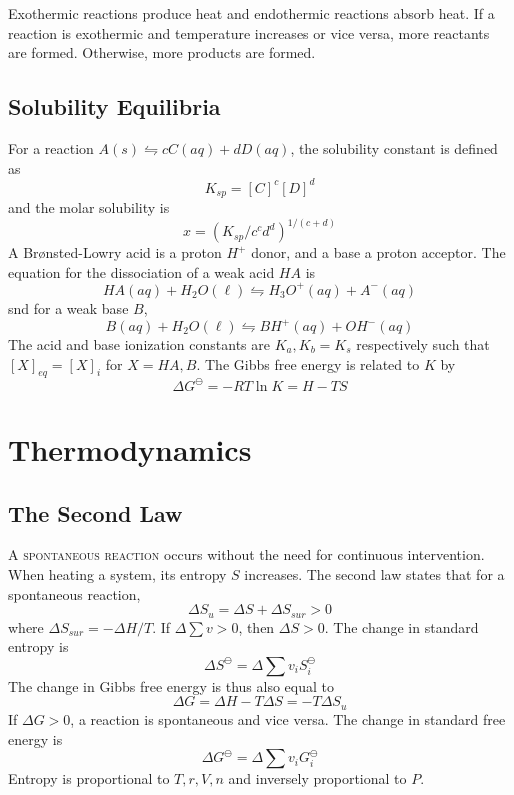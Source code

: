 \documentclass{tufte-book}
\begin{document}
\bigskip
Exothermic reactions produce heat and endothermic reactions absorb heat. If a reaction is exothermic and temperature increases or vice versa, more reactants are formed. Otherwise, more products are formed.

\section{Solubility Equilibria}
For a reaction $A(s) \leftrightharpoons cC(aq) + dD(aq)$, the solubility constant is defined as \begin{equation}
  K_{sp} = [C]^c [D]^d
\end{equation}
and the molar solubility is \begin{equation}
  x = (K_{sp}/c^cd^d)^{1/(c+d)}
\end{equation}
A Brønsted-Lowry acid is a proton $H^+$ donor, and a base a proton acceptor. The equation for the dissociation of a weak acid $HA$ is \begin{equation}
  HA(aq) + H_2O (\ell) \leftrightharpoons H_3O^+ (aq) + A^- (aq)
\end{equation}
snd for a weak base $B$,
\begin{equation}
  B(aq) + H_2O (\ell) \leftrightharpoons BH^+ (aq) + OH^-(aq)
\end{equation}
The acid and base ionization constants are $K_a,K_b = K_s$ respectively such that $[X]_{eq} = [X]_i$ for $X = HA, B$. The Gibbs free energy is related to $K$ by \begin{equation}
\Delta G^\ominus = -RT \ln K = H-TS
\end{equation}

\chapter{Thermodynamics}

\section{The Second Law}
\textsc{A spontaneous reaction} occurs without the need for continuous intervention. When heating a system, its entropy $S$ increases. The second law states that for a spontaneous reaction, \begin{equation}
  \Delta S_u = \Delta S + \Delta S_{sur} > 0
\end{equation}
where $\Delta S_{sur} = - \Delta H/T$. If $\Delta \sum v > 0$, then $\Delta S > 0$. The change in standard entropy is \begin{equation}
  \Delta S^\ominus = \Delta \sum v_i S^\ominus_i
\end{equation}
The change in Gibbs free energy is thus also equal to \begin{equation}
  \Delta G = \Delta H - T \Delta S = -T \Delta S_u
\end{equation}
If $\Delta G > 0$, a reaction is spontaneous and vice versa. The change in standard free energy is \begin{equation}
  \Delta G^\ominus = \Delta \sum v_i G^\ominus_i
\end{equation}
Entropy is proportional to $T, r, V, n$ and inversely proportional to $P$.
\end{document}
